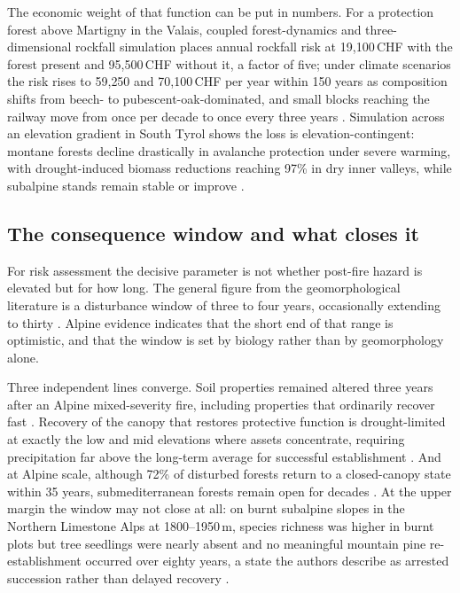 \documentclass[11pt,a4paper]{article}
\begin{document}
The economic weight of that function can be put in numbers. For a protection forest above Martigny in the Valais, coupled forest-dynamics and three-dimensional rockfall simulation places annual rockfall risk at 19{,}100\,CHF with the forest present and 95{,}500\,CHF without it, a factor of five; under climate scenarios the risk rises to 59{,}250 and 70{,}100\,CHF per year within 150 years as composition shifts from beech- to pubescent-oak-dominated, and small blocks reaching the railway move from once per decade to once every three years \citep{moos_climate_2021}. Simulation across an elevation gradient in South Tyrol shows the loss is elevation-contingent: montane forests decline drastically in avalanche protection under severe warming, with drought-induced biomass reductions reaching 97\% in dry inner valleys, while subalpine stands remain stable or improve \citep{hillebrand_contrasting_2023}.

\subsection{The consequence window and what closes it}

For risk assessment the decisive parameter is not whether post-fire hazard is elevated but for how long. The general figure from the geomorphological literature is a disturbance window of three to four years, occasionally extending to thirty \citep{santi_wildfire_2022}. Alpine evidence indicates that the short end of that range is optimistic, and that the window is set by biology rather than by geomorphology alone.

Three independent lines converge. Soil properties remained altered three years after an Alpine mixed-severity fire, including properties that ordinarily recover fast \citep{negri_wildfire_2026}. Recovery of the canopy that restores protective function is drought-limited at exactly the low and mid elevations where assets concentrate, requiring precipitation far above the long-term average for successful establishment \citep{moser_potential_2010}. And at Alpine scale, although 72\% of disturbed forests return to a closed-canopy state within 35 years, submediterranean forests remain open for decades \citep{stritih_alternative_2023}. At the upper margin the window may not close at all: on burnt subalpine slopes in the Northern Limestone Alps at 1800--1950\,m, species richness was higher in burnt plots but tree seedlings were nearly absent and no meaningful mountain pine re-establishment occurred over eighty years, a state the authors describe as arrested succession rather than delayed recovery \citep{degiuli_arrested_2024}.
\end{document}
